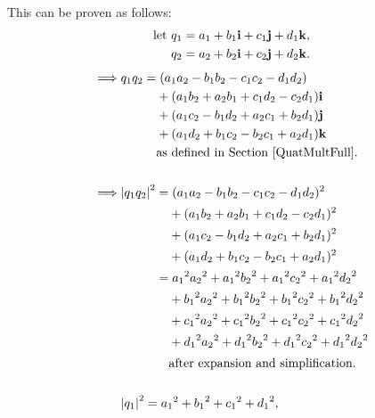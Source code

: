\documentclass[11pt]{article}
\begin{document}
This can be proven as follows:
\begingroup
\allowdisplaybreaks
\begin{equation}
    \begin{aligned}
        \text{let } & q_1 = a_1 + b_1\vb{i} + c_1\vb{j} + d_1\vb{k}, \\
        & q_2 = a_2 + b_2\vb{i} + c_2\vb{j} + d_2\vb{k}. \\
    \end{aligned}
\end{equation}
\begin{alignat}{2}
    \implies & q_1q_2 = (a_1a_2 - b_1b_2 - c_1c_2 - d_1d_2) \\
             & \phantom{q_1q_2=} + (a_1b_2 + a_2b_1 + c_1d_2 - c_2d_1)\vb{i} \nonumber \\
             & \phantom{q_1q_2=} + (a_1c_2 - b_1d_2 + a_2c_1 + b_2d_1)\vb{j} \nonumber \\
             & \phantom{q_1q_2=} + (a_1d_2 + b_1c_2 - b_2c_1 + a_2d_1)\vb{k} \nonumber \\
             & \phantom{q_1q_2=} \text{as defined in Section \ref{QuatMultFull}}. \nonumber \\[15pt]
    \implies & \abs{q_1q_2}^2 = (a_1a_2 - b_1b_2 - c_1c_2 - d_1d_2)^2 \\
             & \phantom{\abs{q_1q_2}^2=} + (a_1b_2 + a_2b_1 + c_1d_2 - c_2d_1)^2 \nonumber \\
             & \phantom{\abs{q_1q_2}^2=} + (a_1c_2 - b_1d_2 + a_2c_1 + b_2d_1)^2 \nonumber \\
             & \phantom{\abs{q_1q_2}^2=} + (a_1d_2 + b_1c_2 - b_2c_1 + a_2d_1)^2 \nonumber \\
             & \phantom{\abs{q_1q_2}^2} = {a_1}^2{a_2}^2 + {a_1}^2{b_2}^2 + {a_1}^2{c_2}^2 + {a_1}^2{d_2}^2 \label{eqnq1q2-1} \\
             & \phantom{\abs{q_1q_2}^2=} + {b_1}^2{a_2}^2 + {b_1}^2{b_2}^2 + {b_1}^2{c_2}^2 + {b_1}^2{d_2}^2 \nonumber \\
             & \phantom{\abs{q_1q_2}^2=} + {c_1}^2{a_2}^2 + {c_1}^2{b_2}^2 + {c_1}^2{c_2}^2 + {c_1}^2{d_2}^2 \nonumber \\
             & \phantom{\abs{q_1q_2}^2=} + {d_1}^2{a_2}^2 + {d_1}^2{b_2}^2 + {d_1}^2{c_2}^2 + {d_1}^2{d_2}^2 \nonumber \\
             & \phantom{\abs{q_1q_2}^2=} \text{after expansion and simplification.} \\[15pt]
    & \abs{q_1}^2 = {a_1}^2 + {b_1}^2 + {c_1}^2 + {d_1}^2, \\

\end{alignat}
\end{document}

